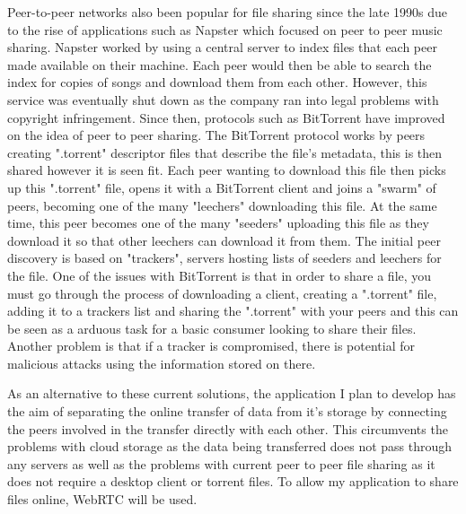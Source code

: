 \documentclass[]{report}
\begin{document}
	Peer-to-peer networks also been popular for file sharing since the late 1990s due to the rise of applications such as Napster which focused on peer to peer music sharing. Napster worked by using a central server to index files that each peer made available on their machine. Each peer would then be able to search the index for copies of songs and download them from each other. However, this service was eventually shut down as the company ran into legal problems with copyright infringement. Since then, protocols such as BitTorrent have improved on the idea of peer to peer sharing. The BitTorrent protocol works by peers creating ".torrent" descriptor files that describe the file's metadata, this is then shared however it is seen fit. Each peer wanting to download this file then picks up this ".torrent" file, opens it with a BitTorrent client and joins a "swarm" of peers, becoming one of the many "leechers" downloading this file. At the same time, this peer becomes one of the many "seeders" uploading this file as they download it so that other leechers can download it from them. The initial peer discovery is based on "trackers", servers hosting lists of seeders and leechers for the file. One of the issues with BitTorrent is that in order to share a file, you must go through the process of downloading a client, creating a ".torrent" file, adding it to a trackers list and sharing the ".torrent" with your peers and this can be seen as a arduous task for a basic consumer looking to share their files. Another problem is that if a tracker is compromised, there is potential for malicious attacks using the information stored on there.

	As an alternative to these current solutions, the application I plan to develop has the aim of separating the online transfer of data from it's storage by connecting the peers involved in the transfer directly with each other. This circumvents the problems with cloud storage as the data being transferred does not pass through any servers as well as the problems with current peer to peer file sharing as it does not require a desktop client or torrent files. To allow my application to share files online, WebRTC will be used.
	
\end{document}
